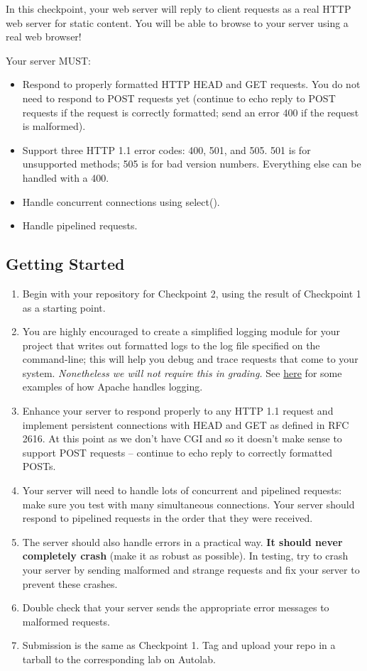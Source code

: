 \label{sec:cp2}
In this checkpoint, your web server will reply to client requests as a real HTTP web server for static content. You will be able to browse to your server using a real web browser!

\vspace{5pt}

\noindent Your server MUST:
\begin{itemize}
  \item Respond to properly formatted HTTP HEAD and GET requests. You do not need to respond to POST requests yet (continue to echo reply to POST requests if the request is correctly formatted; send an error 400 if the request is malformed).
    \item Support three HTTP 1.1 error codes: 400, 501, and 505. 501 is for unsupported methods; 505 is for bad version numbers. Everything else can be handled with a 400.
    \item Handle concurrent connections using select().
    \item Handle pipelined requests.
\end{itemize}

\subsection{Getting Started}
\begin{enumerate}
\item Begin with your repository for Checkpoint 2, using the result of Checkpoint 1 as a starting point.
\item You are highly encouraged to create a simplified logging module for your project that writes out formatted logs to the log file specified on the command-line; this will help you debug and trace requests that come to your system. {\it Nonetheless we will not require this in grading.} See \href{https://httpd.apache.org/docs/1.3/logs.html\#common}{here} for some examples of how Apache handles logging.
\item Enhance your server to respond properly to any HTTP 1.1 request and implement persistent connections with HEAD and GET as defined in RFC 2616. At this point as we don't have CGI and so it doesn't make sense to support POST requests -- continue to echo reply to correctly formatted POSTs.
\item Your server will need to handle lots of concurrent and pipelined requests: make sure you test with many simultaneous connections. Your server should respond to pipelined requests in the order that they were received.
\item The server should also handle errors in a practical way. {\bf It should never completely crash} (make it as robust as possible). In testing, try to crash your server by sending malformed and strange requests and fix your server to prevent these crashes.
\item Double check that your server sends the appropriate error messages to malformed requests.
\item Submission is the same as Checkpoint 1. Tag and upload your repo in a tarball to the corresponding lab on Autolab.
\end{enumerate}


